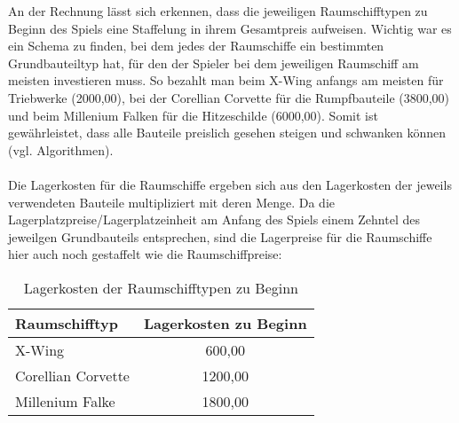 An der Rechnung lässt sich erkennen, dass die jeweiligen Raumschifftypen zu Beginn des Spiels eine Staffelung in ihrem Gesamtpreis aufweisen. Wichtig war es ein Schema zu finden, bei dem jedes der Raumschiffe ein bestimmten Grundbauteiltyp hat, für den der Spieler bei dem jeweiligen Raumschiff am meisten investieren muss. So bezahlt man beim X-Wing anfangs am meisten für Triebwerke (2000,00\curr{}), bei der Corellian Corvette für die Rumpfbauteile (3800,00\curr{}) und beim Millenium Falken für die Hitzeschilde (6000,00\curr{}). Somit ist gewährleistet, dass alle Bauteile preislich gesehen steigen und schwanken können (vgl. Algorithmen). 
\\
\\
Die Lagerkosten für die Raumschiffe ergeben sich aus den Lagerkosten der jeweils verwendeten Bauteile multipliziert mit deren Menge. Da die Lagerplatzpreise/Lagerplatzeinheit am Anfang des Spiels einem Zehntel des jeweilgen Grundbauteils entsprechen, sind die Lagerpreise für die Raumschiffe hier auch noch gestaffelt wie die Raumschiffpreise:

\begin{table}[ht]\small
     \centering
     \begin{tabular}{ | l | c | }
          \hline
          Raumschifftyp & Lagerkosten zu Beginn \\
          \hline \hline
          X-Wing & 600,00\curr{}\\ \hline
          Corellian Corvette & 1200,00\curr{}\\ \hline
          Millenium Falke & 1800,00\curr{} \\
          \hline
     \end{tabular}
     \caption{Lagerkosten der Raumschifftypen zu Beginn}
     \label{tab:spielwelt-datenbasis-raumschiffe-zusammensetzung-1}
\end{table}
	




